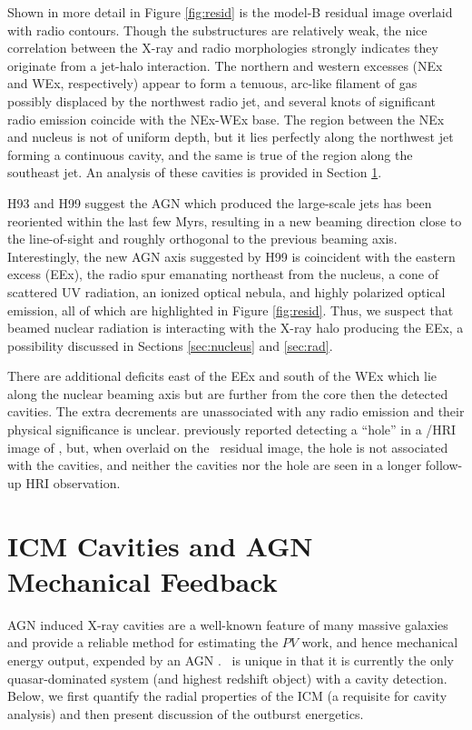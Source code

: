 \documentclass[useAMS,usenatbib]{mn2e}
\begin{document}
Shown in more detail in Figure \ref{fig:resid} is the model-B residual
image overlaid with radio contours. Though the substructures are
relatively weak, the nice correlation between the X-ray and radio
morphologies strongly indicates they originate from a jet-halo
interaction. The northern and western excesses (NEx and WEx,
respectively) appear to form a tenuous, arc-like filament of gas
possibly displaced by the northwest radio jet, and several knots of
significant radio emission coincide with the NEx-WEx base. The region
between the NEx and nucleus is not of uniform depth, but it lies
perfectly along the northwest jet forming a continuous cavity, and the
same is true of the region along the southeast jet. An analysis of
these cavities is provided in Section \ref{sec:cavs}.

H93 and H99 suggest the AGN which produced the large-scale jets has
been reoriented within the last few Myrs, resulting in a new beaming
direction close to the line-of-sight and roughly orthogonal to the
previous beaming axis. Interestingly, the new AGN axis suggested by
H99 is coincident with the eastern excess (EEx), the radio spur
emanating northeast from the nucleus, a cone of scattered UV
radiation, an ionized optical nebula, and highly polarized optical
emission, all of which are highlighted in Figure
\ref{fig:resid}. Thus, we suspect that beamed nuclear radiation is
interacting with the X-ray halo producing the EEx, a possibility
discussed in Sections \ref{sec:nucleus} and \ref{sec:rad}.

There are additional deficits east of the EEx and south of the WEx
which lie along the nuclear beaming axis but are further from the core
then the detected cavities. The extra decrements are unassociated with
any radio emission and their physical significance is
unclear. \citet{1995MNRAS.274L..63F} previously reported detecting a
``hole'' in a \rosat/HRI image of \irs, but, when overlaid on the
\cxo\ residual image, the hole is not associated with the cavities,
and neither the cavities nor the hole are seen in a longer follow-up
HRI observation.

\section{ICM Cavities and AGN Mechanical Feedback}
\label{sec:cavs}

AGN induced X-ray cavities are a well-known feature of many massive
galaxies and provide a reliable method for estimating the $PV$ work,
and hence mechanical energy output, expended by an AGN \citep[see][for
  a review]{mcnamrev}. \irs\ is unique in that it is currently the
only quasar-dominated system (and highest redshift object) with a
cavity detection. Below, we first quantify the radial properties of
the ICM (a requisite for cavity analysis) and then present discussion
of the outburst energetics.
\end{document}
